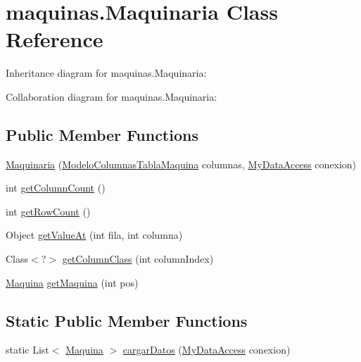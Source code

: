 \hypertarget{classmaquinas_1_1_maquinaria}{}\section{maquinas.\+Maquinaria Class Reference}
\label{classmaquinas_1_1_maquinaria}


Inheritance diagram for maquinas.\+Maquinaria\+:


Collaboration diagram for maquinas.\+Maquinaria\+:
\subsection*{Public Member Functions}
\begin{DoxyCompactItemize}
\item 
\mbox{\hyperlink{classmaquinas_1_1_maquinaria_adf1a7cb67d56325ab9689a85945a17bd}{Maquinaria}} (\mbox{\hyperlink{classmaquinas_1_1_modelo_columnas_tabla_maquina}{Modelo\+Columnas\+Tabla\+Maquina}} columnas, \mbox{\hyperlink{classconexion_s_q_l_1_1_my_data_access}{My\+Data\+Access}} conexion)
\item 
int \mbox{\hyperlink{classmaquinas_1_1_maquinaria_a4d573c7762633b39ef7305ecb1b6ffa3}{get\+Column\+Count}} ()
\item 
int \mbox{\hyperlink{classmaquinas_1_1_maquinaria_aeceaddd786b36d5be354b8e9a581caa3}{get\+Row\+Count}} ()
\item 
Object \mbox{\hyperlink{classmaquinas_1_1_maquinaria_a0fa4ffa21f2f3cc2386634fb4c8b810e}{get\+Value\+At}} (int fila, int columna)
\item 
Class$<$?$>$ \mbox{\hyperlink{classmaquinas_1_1_maquinaria_ae792351e004fa5f3d10900e33f10186d}{get\+Column\+Class}} (int column\+Index)
\item 
\mbox{\hyperlink{classmaquinas_1_1_maquina}{Maquina}} \mbox{\hyperlink{classmaquinas_1_1_maquinaria_a438161cbcee58e47e57c1c1f0d0207eb}{get\+Maquina}} (int pos)
\end{DoxyCompactItemize}
\subsection*{Static Public Member Functions}
\begin{DoxyCompactItemize}
\item 
static List$<$ \mbox{\hyperlink{classmaquinas_1_1_maquina}{Maquina}} $>$ \mbox{\hyperlink{classmaquinas_1_1_maquinaria_a8c8ade68894e4e32e50a0130d482bc5e}{cargar\+Datos}} (\mbox{\hyperlink{classconexion_s_q_l_1_1_my_data_access}{My\+Data\+Access}} conexion)
\end{DoxyCompactItemize}


